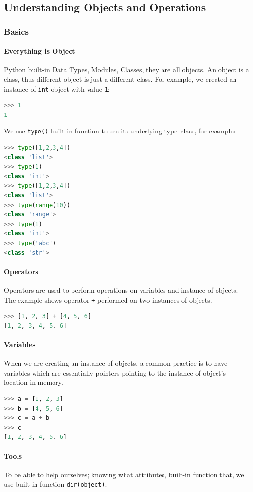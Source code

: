 \documentclass[../main.tex]{subfiles}
\begin{document}
\subsection{Understanding Objects and Operations}
\label{python_subsec_object}

\subsubsection{Basics}
\paragraph{Everything is Object} Python built-in Data Types, Modules, Classes, they are all objects. An object is a class, thus different object is just a different class. For example, we created an instance of \texttt{int} object with value \texttt{1}:
\begin{lstlisting}[language=Python]
>>> 1
1
\end{lstlisting}
We use \texttt{type()} built-in function to see its underlying type--class, for example:
\begin{lstlisting}[language=Python]
>>> type([1,2,3,4])
<class 'list'>
>>> type(1)
<class 'int'>
>>> type([1,2,3,4])
<class 'list'>
>>> type(range(10))
<class 'range'>
>>> type(1)
<class 'int'>
>>> type('abc')
<class 'str'>
\end{lstlisting}

\paragraph{Operators} Operators are used to perform operations on variables and instance of objects. The example shows operator \texttt{+} performed on two instances of objects. 
\begin{lstlisting}[language=Python]
>>> [1, 2, 3] + [4, 5, 6]
[1, 2, 3, 4, 5, 6]
\end{lstlisting}
\paragraph{Variables} When we are creating an instance of objects, a common practice is to have variables which are essentially pointers pointing to the instance of object's location in memory.
\begin{lstlisting}[language=Python]
>>> a = [1, 2, 3]
>>> b = [4, 5, 6]
>>> c = a + b
>>> c
[1, 2, 3, 4, 5, 6]
\end{lstlisting}

\paragraph{Tools} To be able to help ourselves; knowing what attributes, built-in function that, we use built-in function \texttt{dir(object)}.
\end{document}
